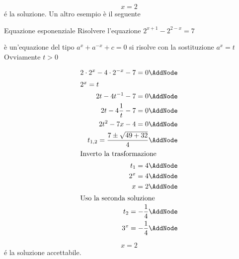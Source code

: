 	\[x=2\]
	\'{e} la soluzione.
Un altro esempio è il seguente
\begin{esempiot}{Equazione esponenziale}{}
	Risolvere l'equazione $ 2^{x+1}-2^{2-x}=7$ 
\end{esempiot}
	è un'equazione del tipo $a^{x}+a^{-x}+c=0$ si risolve con la sostituzione $a^{x}=t$
	Ovviamente $t>0$ 
	\begin{NodesList} [margin=4cm]
		\begin{align*}
			 2\cdot 2^{x}-4\cdot 2^{-x}-7=0\AddNode\\
			 \intertext{\hfil $2^x=t$}
			2t-4t^{-1}-7=0\AddNode\\
			2t-4\dfrac{1}{t}-7=0\AddNode\\
			2t^2-7x-4=0\AddNode\\
			t_{1,2}=\dfrac{7\pm\sqrt{49+32}}{4}\AddNode\\
			\intertext{\hfil Inverto la trasformazione}
			t_{1}=4\AddNode\\
			2^{x}=4\AddNode\\
			x=2\AddNode\\
			\intertext{\hfil Uso la seconda soluzione}
			t_{2}=-\dfrac{1}{4} \AddNode\\
			3^x=-\dfrac{1}{4}\AddNode
		\end{align*}
		\LinkNodes{}%
	\end{NodesList}
	\[x=2\]
	\'{e} la soluzione accettabile.
